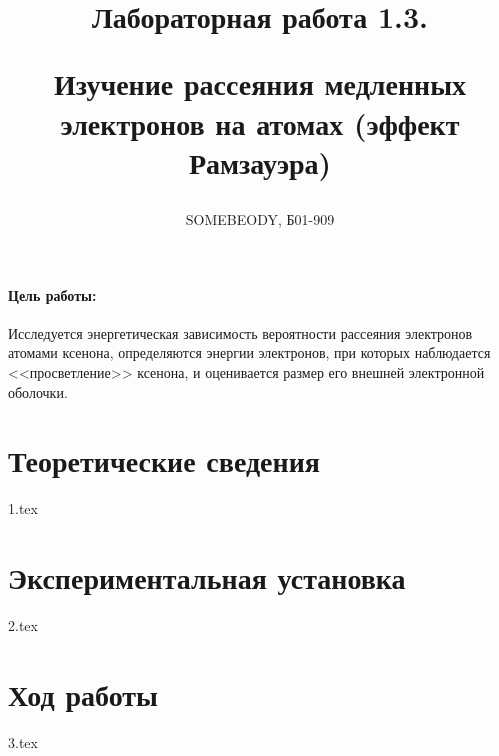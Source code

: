 \documentclass[a5paper, 10pt, twoside]{article} %
\title
{\hfill \break  \hfill \break
\hfill \break  \hfill \break
Лабораторная работа 1.3.

Изучение рассеяния медленных электронов на атомах (эффект Рамзауэра)}
\author{SOMEBEODY, Б01-909}
\begin{document}
\maketitle



\thispagestyle{empty} %

\newpage

\tableofcontents %
\thispagestyle{plain}
\newpage


\paragraph{Цель работы:}

Исследуется энергетическая зависимость вероятности рассеяния электронов атомами
ксенона, определяются энергии электронов, при которых наблюдается
<<просветление>> ксенона, и оценивается размер его внешней электронной оболочки.

\section{Теоретические сведения}
{1.tex}

\section{Экспериментальная установка}
{2.tex}

\section{Ход работы}
{3.tex}
\end{document}
